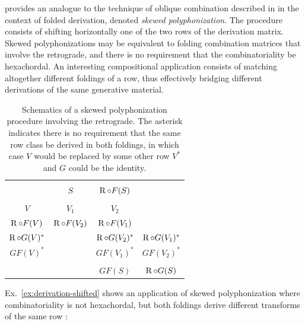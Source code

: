 \cite[216]{Starr1984} provides an analogue to the technique of oblique combination described in \cite[241, 267]{Martino1961} in the context of folded derivation, denoted \emph{skewed polyphonization}. The procedure consists of shifting horizontally one of the two rows of the derivation matrix. Skewed polyphonizations may be equivalent to folding combination matrices that involve the retrograde, and there is no requirement that the combinatoriality be hexachordal. An interesting compositional application consists of matching altogether different foldings of a row, thus effectively bridging different derivations of the same generative material.

\begin{table}[htbp]
	\cite[216]{Starr1984}
    \caption[Skewed Polyphonization Involving the Retrograde]{Schematics of a skewed polyphonization procedure involving the retrograde. The asterisk indicates there is no requirement that the same row class be derived in both foldings, in which case $V$ would be replaced by some other row $V^*$ and $G$ could be the identity.}
    \label{derivation-shifted}
    \centering
    \vspace{12pt}
    \begin{tabular}{ c | c c c }
        \hline\\
        & $S$ & $\operatorname{R} \circ F(S)$ & \\
        \hline\\
        $V$ & $V_1$ & $V_2$ & \\
        $\operatorname{R} \circ F(V)$ & $\operatorname{R} \circ F(V_2)$ & $\operatorname{R} \circ F(V_1)$ & \\
        $\operatorname{R} \circ G(V)^*$ && $\operatorname{R} \circ G(V_2)^*$ & $\operatorname{R} \circ G(V_1)^*$ \\
        $GF(V)^*$ && $GF(V_1)^*$ & $GF(V_2)^*$ \\
        \hline\\
        && $GF(S)$ & $\operatorname{R} \circ G(S)$ \\
        \hline
    \end{tabular}
\end{table}

Ex.~\ref{ex:derivation-shifted} shows an application of skewed polyphonization where combinatoriality is not hexachordal, but both foldings derive different transforms of the same row \cite[216]{Starr1984}:

